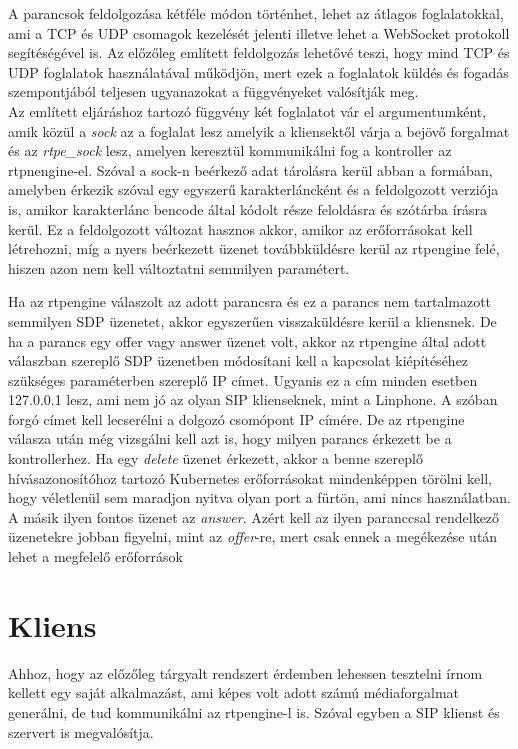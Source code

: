 A parancsok feldolgozása kétféle módon történhet, lehet az átlagos foglalatokkal, ami 
a TCP és UDP csomagok kezelését jelenti illetve lehet a WebSocket protokoll segítéségével 
is. Az előzőleg említett feldolgozás lehetővé teszi, hogy mind TCP és UDP
foglalatok használatával működjön, mert ezek a foglalatok küldés és fogadás szempontjából
teljesen ugyanazokat a függvényeket valósítják meg. \\

Az említett eljáráshoz tartozó függvény két foglalatot vár el argumentumként, amik közül 
a \textit{sock} az a foglalat lesz amelyik a kliensektől várja a bejövő forgalmat és az 
\textit{rtpe\_sock} lesz, amelyen keresztül kommunikálni fog a kontroller az rtpnengine-el. 
Szóval a sock-n beérkező adat tárolásra kerül abban a formában, amelyben érkezik szóval 
egy egyszerű karakterláncként és a feldolgozott verziója is, amikor karakterlánc bencode 
által kódolt része feloldásra és szótárba írásra kerül. Ez a feldolgozott változat hasznos 
akkor, amikor az erőforrásokat kell létrehozni, míg a nyers beérkezett üzenet továbbküldésre 
kerül az rtpengine felé, hiszen azon nem kell változtatni semmilyen paramétert.

Ha az rtpengine válaszolt az adott parancsra és ez a parancs nem tartalmazott semmilyen 
SDP üzenetet, akkor egyszerűen visszaküldésre kerül a kliensnek. De ha a parancs egy offer
vagy answer üzenet volt, akkor az rtpengine által adott válaszban szereplő SDP üzenetben
módosítani kell a kapcsolat kiépítéséhez szükséges paraméterben szereplő IP címet. Ugyanis
ez a cím minden esetben 127.0.0.1 lesz, ami nem jó az olyan SIP klienseknek, mint a Linphone.
A szóban forgó címet kell lecserélni a dolgozó csomópont IP címére. De az rtpengine 
válasza után még vizsgálni kell azt is, hogy milyen parancs érkezett be a kontrollerhez. 
Ha egy \textit{delete} üzenet érkezett, akkor a benne szereplő hívásazonosítóhoz tartozó
Kubernetes erőforrásokat mindenképpen törölni kell, hogy véletlenül sem maradjon nyitva
olyan port a fürtön, ami nincs használatban. A másik ilyen fontos üzenet az \textit{answer}.
Azért kell az ilyen paranccsal rendelkező üzenetekre jobban figyelni, mint az \textit{offer}-re,
mert csak ennek a megékezése után lehet a megfelelő erőforrások

\section{Kliens}

Ahhoz, hogy az előzőleg tárgyalt rendszert érdemben lehessen tesztelni írnom
kellett egy saját alkalmazást, ami képes volt adott számú médiaforgalmat 
generálni, de tud kommunikálni az rtpengine-l is. Szóval egyben a SIP
klienst és szervert is megvalósítja.

